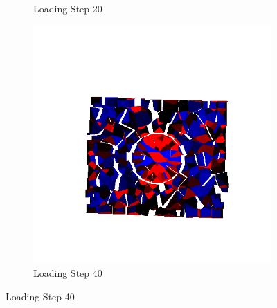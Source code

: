 \begin{figure}[ht!]
\begin{subfigure}{.33\textwidth}
      \caption{Loading Step 20}
      \end{subfigure}%
      \begin{subfigure}{.33\textwidth}
        \centering
        \includegraphics[width=1.0\linewidth]{Files/Small_DEF/Free_IS2/DEP5-STEP(060).png}
        \caption{Loading Step 40}
      \end{subfigure}


\end{figure}
